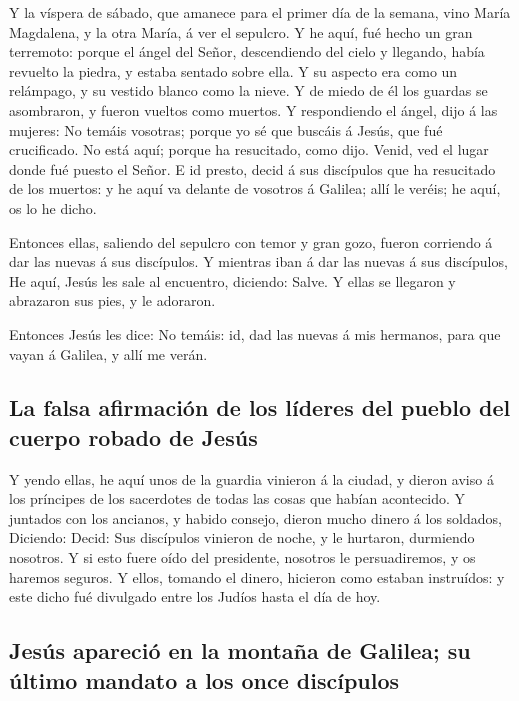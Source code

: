  Y la víspera de sábado, que amanece para el primer día de
la semana, vino María Magdalena, y la otra María, á ver el sepulcro.
 Y he aquí, fué hecho un gran terremoto: porque el ángel del
Señor, descendiendo del cielo y llegando, había revuelto la piedra, y
estaba sentado sobre ella.  Y su aspecto era como un
relámpago, y su vestido blanco como la nieve.  Y de miedo de
él los guardas se asombraron, y fueron vueltos como muertos.
 Y respondiendo el ángel, dijo á las mujeres: No temáis
vosotras; porque yo sé que buscáis á Jesús, que fué crucificado.
 No está aquí; porque ha resucitado, como dijo. Venid, ved
el lugar donde fué puesto el Señor.  E id presto, decid á
sus discípulos que ha resucitado de los muertos: y he aquí va delante de
vosotros á Galilea; allí le veréis; he aquí, os lo he dicho.

 Entonces ellas, saliendo del sepulcro con temor y gran
gozo, fueron corriendo á dar las nuevas á sus discípulos. Y mientras
iban á dar las nuevas á sus discípulos,  He aquí, Jesús les
sale al encuentro, diciendo: Salve. Y ellas se llegaron y abrazaron sus
pies, y le adoraron.

 Entonces Jesús les dice: No temáis: id, dad las nuevas á
mis hermanos, para que vayan á Galilea, y allí me verán.

\hypertarget{la-falsa-afirmaciuxf3n-de-los-luxedderes-del-pueblo-del-cuerpo-robado-de-jesuxfas}{%
\subsection{La falsa afirmación de los líderes del pueblo del cuerpo
robado de
Jesús}\label{la-falsa-afirmaciuxf3n-de-los-luxedderes-del-pueblo-del-cuerpo-robado-de-jesuxfas}}

 Y yendo ellas, he aquí unos de la guardia vinieron á la
ciudad, y dieron aviso á los príncipes de los sacerdotes de todas las
cosas que habían acontecido.  Y juntados con los ancianos,
y habido consejo, dieron mucho dinero á los soldados, 
Diciendo: Decid: Sus discípulos vinieron de noche, y le hurtaron,
durmiendo nosotros.  Y si esto fuere oído del presidente,
nosotros le persuadiremos, y os haremos seguros.  Y ellos,
tomando el dinero, hicieron como estaban instruídos: y este dicho fué
divulgado entre los Judíos hasta el día de hoy.

\hypertarget{jesuxfas-apareciuxf3-en-la-montauxf1a-de-galilea-su-uxfaltimo-mandato-a-los-once-discuxedpulos}{%
\subsection{Jesús apareció en la montaña de Galilea; su último mandato a
los once
discípulos}\label{jesuxfas-apareciuxf3-en-la-montauxf1a-de-galilea-su-uxfaltimo-mandato-a-los-once-discuxedpulos}}

